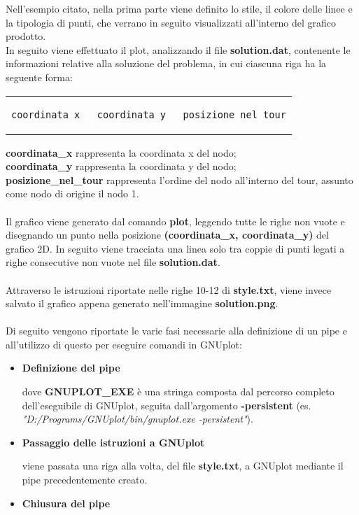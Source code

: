 Nell'esempio citato, nella prima parte viene definito lo stile, il colore delle linee e la tipologia di punti, che verrano in seguito visualizzati all'interno del grafico prodotto.\\ In seguito viene effettuato il plot, analizzando il file \textbf{solution.dat}, contenente le informazioni relative alla soluzione del problema, in cui ciascuna riga ha la seguente forma:
\begin{center}
\begin{tabular}{c}
\begin{lstlisting}[linewidth=290pt,basicstyle=\footnotesize\sffamily,]     
coordinata_x   coordinata_y   posizione_nel_tour
\end{lstlisting}
\end{tabular}
\end{center}
\textbf{coordinata\_x} rappresenta la coordinata x del nodo;\\
\textbf{coordinata\_y} rappresenta la coordinata y del nodo;\\
\textbf{posizione\_nel\_tour} rappresenta l'ordine del nodo all'interno del tour, assunto come nodo di origine il nodo 1.\\\\
Il grafico viene generato dal comando \textbf{plot}, leggendo tutte le righe non vuote e disegnando un punto nella posizione \textbf{(coordinata\_x, coordinata\_y)} del grafico 2D. In seguito viene tracciata una linea solo tra coppie di punti legati a righe consecutive non vuote nel file \textbf{solution.dat}.\\\\
Attraverso le istruzioni riportate nelle righe 10-12 di \textbf{style.txt}, viene invece salvato il grafico appena generato nell'immagine \textbf{solution.png}.\\\\
Di seguito vengono riportate le varie fasi necessarie alla definizione di un pipe e all'utilizzo di questo per eseguire comandi in GNUplot:
\begin{itemize}
\item{\textbf{Definizione del pipe}

dove \textbf{GNUPLOT\_EXE} è una stringa composta dal percorso completo dell'eseguibile di GNUplot, seguita dall'argomento \textbf{-persistent} (es. \textit{"D:/Programs/GNUplot/bin/gnuplot.exe -persistent"}).
}
\item{\textbf{Passaggio delle istruzioni a GNUplot}

viene passata una riga alla volta, del file \textbf{style.txt}, a GNUplot mediante il pipe precedentemente creato.
}
\item{\textbf{Chiusura del pipe}

}
\end{itemize}
